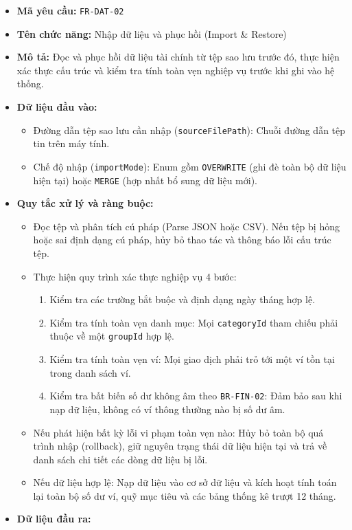 \documentclass[11pt,a4paper]{article}
\providecommand{\tightlist}{
  \setlength{\itemsep}{0pt}\setlength{\parskip}{0pt}}
\begin{document}
\begin{itemize}
\tightlist
\item
  \textbf{Mã yêu cầu:} \texttt{FR-DAT-02}
\item
  \textbf{Tên chức năng:} Nhập dữ liệu và phục hồi (Import \& Restore)
\item
  \textbf{Mô tả:} Đọc và phục hồi dữ liệu tài chính từ tệp sao lưu trước
  đó, thực hiện xác thực cấu trúc và kiểm tra tính toàn vẹn nghiệp vụ
  trước khi ghi vào hệ thống.
\item
  \textbf{Dữ liệu đầu vào:}

  \begin{itemize}
  \tightlist
  \item
    Đường dẫn tệp sao lưu cần nhập (\texttt{sourceFilePath}): Chuỗi
    đường dẫn tệp tin trên máy tính.
  \item
    Chế độ nhập (\texttt{importMode}): Enum gồm \texttt{OVERWRITE} (ghi
    đè toàn bộ dữ liệu hiện tại) hoặc \texttt{MERGE} (hợp nhất bổ sung
    dữ liệu mới).
  \end{itemize}
\item
  \textbf{Quy tắc xử lý và ràng buộc:}

  \begin{itemize}
  \tightlist
  \item
    Đọc tệp và phân tích cú pháp (Parse JSON hoặc CSV). Nếu tệp bị hỏng
    hoặc sai định dạng cú pháp, hủy bỏ thao tác và thông báo lỗi cấu
    trúc tệp.
  \item
    Thực hiện quy trình xác thực nghiệp vụ 4 bước:

    \begin{enumerate}
    \def\labelenumi{\arabic{enumi}.}
    \tightlist
    \item
      Kiểm tra các trường bắt buộc và định dạng ngày tháng hợp lệ.
    \item
      Kiểm tra tính toàn vẹn danh mục: Mọi \texttt{categoryId} tham
      chiếu phải thuộc về một \texttt{groupId} hợp lệ.
    \item
      Kiểm tra tính toàn vẹn ví: Mọi giao dịch phải trỏ tới một ví tồn
      tại trong danh sách ví.
    \item
      Kiểm tra bất biến số dư không âm theo \texttt{BR-FIN-02}: Đảm bảo
      sau khi nạp dữ liệu, không có ví thông thường nào bị số dư âm.
    \end{enumerate}
  \item
    Nếu phát hiện bất kỳ lỗi vi phạm toàn vẹn nào: Hủy bỏ toàn bộ quá
    trình nhập (rollback), giữ nguyên trạng thái dữ liệu hiện tại và trả
    về danh sách chi tiết các dòng dữ liệu bị lỗi.
  \item
    Nếu dữ liệu hợp lệ: Nạp dữ liệu vào cơ sở dữ liệu và kích hoạt tính
    toán lại toàn bộ số dư ví, quỹ mục tiêu và các bảng thống kê trượt
    12 tháng.
  \end{itemize}
\item
  \textbf{Dữ liệu đầu ra:}


\end{itemize}
\end{document}
